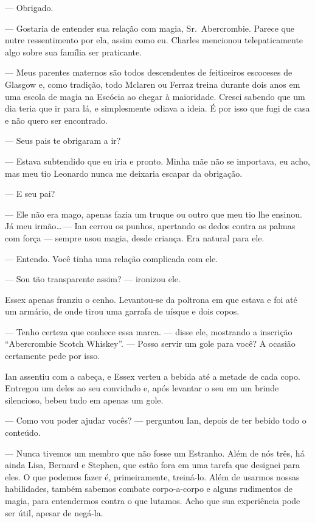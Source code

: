 --- Obrigado.

--- Gostaria de entender sua relação com magia, Sr.~Abercrombie. Parece que
nutre ressentimento por ela, assim como eu. Charles mencionou telepaticamente
algo sobre sua família ser praticante.

--- Meus parentes maternos são todos descendentes de feiticeiros escoceses de
Glasgow e, como tradição, todo Mclaren ou Ferraz treina durante dois anos em
uma escola de magia na Escócia ao chegar à maioridade. Cresci sabendo que um
dia teria que ir para lá, e simplesmente odiava a ideia. É por isso que fugi de
casa e não quero ser encontrado.

--- Seus pais te obrigaram a ir?

--- Estava subtendido que eu iria e pronto. Minha mãe não se importava, eu
acho, mas meu tio Leonardo nunca me deixaria escapar da obrigação.

--- E seu pai?

--- Ele não era mago, apenas fazia um truque ou outro que meu tio lhe ensinou.
Já meu irmão\ldots\,--- Ian cerrou os punhos, apertando os dedos contra as
palmas com força --- sempre usou magia, desde criança. Era natural para ele.

--- Entendo. Você tinha uma relação complicada com ele.

--- Sou tão transparente assim? --- ironizou ele.

Essex apenas franziu o cenho. Levantou-se da poltrona em que estava e foi até
um armário, de onde tirou uma garrafa de uísque e dois copos.

--- Tenho certeza que conhece essa marca. --- disse ele, mostrando a inscrição
“Abercrombie Scotch Whiskey”. --- Posso servir um gole para você? A ocasião
certamente pede por isso.

Ian assentiu com a cabeça, e Essex verteu a bebida até a metade de cada copo.
Entregou um deles ao seu convidado e, após levantar o seu em um brinde
silencioso, bebeu tudo em apenas um gole.

--- Como vou poder ajudar vocês? --- perguntou Ian, depois de ter bebido todo o
conteúdo.

--- Nunca tivemos um membro que não fosse um Estranho. Além de nós três, há
ainda Lisa, Bernard e Stephen, que estão fora em uma tarefa que designei para
eles. O que podemos fazer é, primeiramente, treiná-lo. Além de usarmos nossas
habilidades, também sabemos combate corpo-a-corpo e alguns rudimentos de magia,
para entendermos contra o que lutamos. Acho que sua experiência pode ser útil,
apesar de negá-la.

